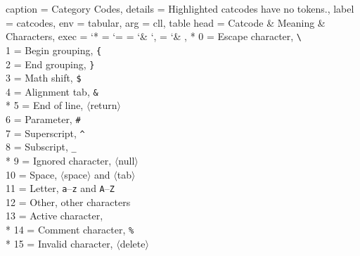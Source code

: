 \documentclass{article}
\newcommand\charsym[1]{\texttt{#1}}
\newcommand\charname[1]{$\langle$#1$\rangle$}
\begin{document}
\begin{tableobject}{%
	caption = Category Codes,
	details = Highlighted catcodes have no tokens.,
	label = catcodes,
	env = tabular,
	arg = cll,
	table head = Catcode & Meaning & Characters,
	exec = {%
		\catcode`* = \active
		\catcode`= = \the\catcode`&%
		\catcode`, = \the\catcode`&%
	},
}
	*  0 = Escape character,   \charsym\textbackslash \\
	   1 = Begin grouping,     \charsym\{ \\
	   2 = End grouping,       \charsym\} \\
	   3 = Math shift,         \charsym\$ \\
	   4 = Alignment tab,      \charsym\& \\
	*  5 = End of line,        \charname{return} \\
	   6 = Parameter,          \charsym\# \\
	   7 = Superscript,        \charsym\^ \\
	   8 = Subscript,          \charsym\_ \\
	*  9 = Ignored character,  \charname{null} \\
	  10 = Space,              \charname{space} and \charname{tab} \\
	  11 = Letter,             \charsym{a}--\charsym{z} and \charsym{A}--\charsym{Z} \\
	  12 = Other,              other characters \\
	  13 = Active character,   \charsym{\string~} \\
	* 14 = Comment character,  \charsym\% \\
	* 15 = Invalid character,  \charname{delete} \\
\end{tableobject}
\end{document}
